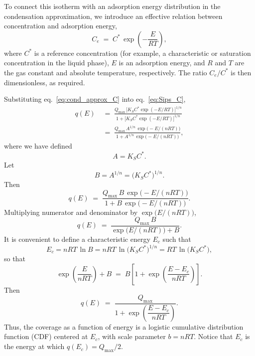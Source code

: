 \documentclass[12pt]{article}
\begin{document}
	To connect this isotherm with an adsorption energy distribution in the
	condensation approximation, we introduce an effective relation between
	concentration and adsorption energy,
	\begin{equation}
		C_e
		\;=\;
		C^{\ast}\,\exp\!\left(-\frac{E}{RT}\right),
		\label{eq:cond_approx_C}
	\end{equation}
	where \(C^{\ast}\) is a reference concentration (for example, a
	characteristic or saturation concentration in the liquid phase), \(E\) is
	an adsorption energy, and \(R\) and \(T\) are the gas constant and absolute
	temperature, respectively. The ratio \(C_e/C^{\ast}\) is then
	dimensionless, as required.
	
	Substituting eq.~\eqref{eq:cond_approx_C} into eq.~\eqref{eq:Sips_C},
	\begin{align}
		q(E)
		\;&=\;
		\frac{Q_{\max}\,\bigl[K_S C^{\ast}\exp(-E/RT)\bigr]^{1/n}}
		{1 + \bigl[K_S C^{\ast}\exp(-E/RT)\bigr]^{1/n}}
		\nonumber\\[4pt]
		\;&=\;
		\frac{Q_{\max}\,A^{1/n}\,\exp\bigl(-E/(nRT)\bigr)}
		{1 + A^{1/n}\,\exp\bigl(-E/(nRT)\bigr)},
	\end{align}
	where we have defined
	\begin{equation}
		A = K_S C^{\ast}.
	\end{equation}
	Let
	\begin{equation}
		B = A^{1/n} = \bigl(K_S C^{\ast}\bigr)^{1/n}.
	\end{equation}
	Then
	\begin{equation}
		q(E)
		\;=\;
		\frac{Q_{\max}\,B\,\exp\bigl(-E/(nRT)\bigr)}
		{1 + B\,\exp\bigl(-E/(nRT)\bigr)}.
	\end{equation}
	Multiplying numerator and denominator by \(\exp\bigl(E/(nRT)\bigr)\),
	\begin{equation}
		q(E)
		\;=\;
		\frac{Q_{\max}\,B}
		{\exp\bigl(E/(nRT)\bigr) + B}.
	\end{equation}
	It is convenient to define a characteristic energy \(E_c\) such that
	\begin{equation}
		E_c = nRT\,\ln B
		= nRT\,\ln\bigl(K_S C^{\ast}\bigr)^{1/n}
		= RT\,\ln\bigl(K_S C^{\ast}\bigr),
	\end{equation}
	so that
	\begin{equation}
		\exp\!\left(\frac{E}{nRT}\right) + B
		\;=\;
		B\left[1 + \exp\!\left(\frac{E - E_c}{nRT}\right)\right].
	\end{equation}
	Then
	\begin{equation}
		q(E)
		\;=\;
		\frac{Q_{\max}}
		{1 + \exp\!\left(\dfrac{E - E_c}{nRT}\right)}.
		\label{eq:qE_logistic_conc}
	\end{equation}
	Thus, the coverage as a function of energy is a logistic cumulative
	distribution function (CDF) centered at \(E_c\), with scale parameter
	\(b = nRT\). Notice that \(E_c\) is the energy at which \(q(E_c) = Q_{\max}/2\).
	
\end{document}
